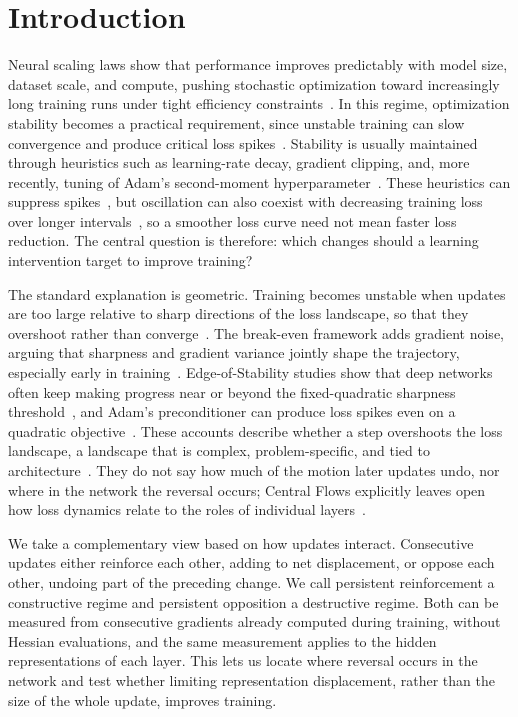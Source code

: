 \section{Introduction}
\label{sec:introduction}


Neural scaling laws show that performance improves predictably with model size, dataset scale, and compute, pushing stochastic optimization toward increasingly long training runs under tight efficiency constraints~\cite{hestness2017deep, kaplan2020scaling, henighan2020scaling, hoffmann2022chinchilla}. In this regime, optimization stability becomes a practical requirement, since unstable training can slow convergence and produce critical loss spikes~\cite{bai2026spikes}. Stability is usually maintained through heuristics such as learning-rate decay, gradient clipping, and, more recently, tuning of Adam's second-moment hyperparameter~\cite{loshchilov2016sgdr,pascanu2013difficulty,bai2026spikes}. These heuristics can suppress spikes~\cite{zhang2022opt}, but oscillation can also coexist with decreasing training loss over longer intervals~\cite{cohen2021edge,damian2023self}, so a smoother loss curve need not mean faster loss reduction. The central question is therefore: which changes should a learning intervention target to improve training?

The standard explanation is geometric. Training becomes unstable when updates are too large relative to sharp directions of the loss landscape, so that they overshoot rather than converge~\cite{polyak1964methods, bertsekas1997nonlinear}. The break-even framework adds gradient noise, arguing that sharpness and gradient variance jointly shape the trajectory, especially early in training~\cite{jastrzebski2020break}. Edge-of-Stability studies show that deep networks often keep making progress near or beyond the fixed-quadratic sharpness threshold~\cite{cohen2021edge, arora2022understanding, damian2023self}, and Adam's preconditioner can produce loss spikes even on a quadratic objective~\cite{kingma2014adam,bai2026spikes}. These accounts describe whether a step overshoots the loss landscape, a landscape that is complex, problem-specific, and tied to architecture~\cite{ly2025multifractal,yang2021taxonomizing,ma2022multiscale,li2018visualizing}. They do not say how much of the motion later updates undo, nor where in the network the reversal occurs; Central Flows explicitly leaves open how loss dynamics relate to the roles of individual layers~\cite{cohen2025central}.

We take a complementary view based on how updates interact. Consecutive updates either reinforce each other, adding to net displacement, or oppose each other, undoing part of the preceding change. We call persistent reinforcement a constructive regime and persistent opposition a destructive regime. Both can be measured from consecutive gradients already computed during training, without Hessian evaluations, and the same measurement applies to the hidden representations of each layer. This lets us locate where reversal occurs in the network and test whether limiting representation displacement, rather than the size of the whole update, improves training.

